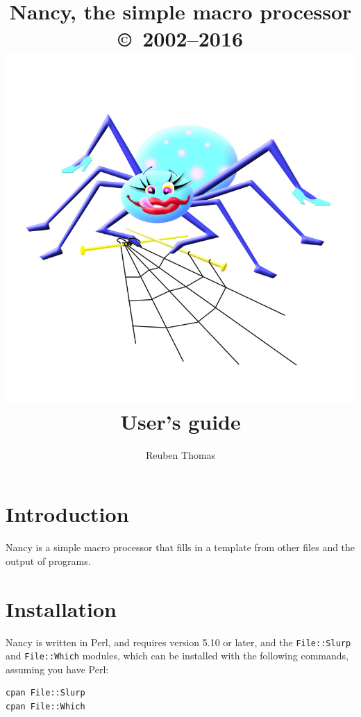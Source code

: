 \documentclass[a4paper,english]{scrartcl}
\begin{document}
\title{Nancy, the simple macro processor\\{\large\copyright\ 2002--2016}\\\includegraphics[scale=0.45]{logo/nancy.png}
\\User’s guide}
\author{Reuben Thomas}
\maketitle

\section{Introduction}

Nancy is a simple macro processor that fills in a template from other files and the output of programs.

\section{Installation}

Nancy is written in Perl, and requires version 5.10 or later, and the \verb|File::Slurp| and \verb|File::Which| modules, which can be installed with the following commands, assuming you have Perl:

\begin{verbatim}
cpan File::Slurp
cpan File::Which
\end{verbatim}
\end{document}
